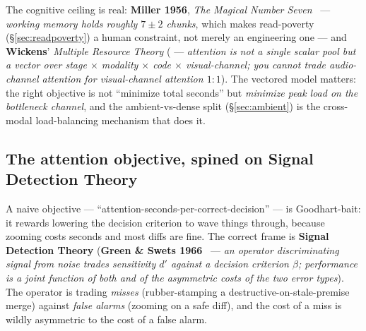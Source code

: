 \documentclass[11pt,a4paper]{article}
\theoremstyle{definition}
\theoremstyle{plain}
\begin{document}

The cognitive ceiling is real: \textbf{Miller 1956}, \emph{The Magical Number
Seven}~ --- \emph{working memory holds roughly $7\pm2$ chunks},
which makes read-poverty (\S\ref{sec:readpoverty}) a human constraint, not merely an
engineering one --- and \textbf{Wickens}' \emph{Multiple Resource Theory}
( --- \emph{attention is not a single scalar pool but a vector
over stage $\times$ modality $\times$ code $\times$ visual-channel; you cannot trade
audio-channel attention for visual-channel attention $1{:}1$}). The vectored model
matters: the right objective is not ``minimize total seconds'' but \emph{minimize
peak load on the bottleneck channel}, and the ambient-vs-dense split
(\S\ref{sec:ambient}) is the cross-modal load-balancing mechanism that does it.

\subsection{The attention objective, spined on Signal Detection Theory}\label{sec:sdt}

A naive objective --- ``attention-seconds-per-correct-decision'' --- is
Goodhart-bait: it rewards lowering the decision criterion to wave things through,
because zooming costs seconds and most diffs are fine. The correct frame is
\textbf{Signal Detection Theory} (\textbf{Green \& Swets 1966}~
--- \emph{an operator discriminating signal from noise trades sensitivity $d'$
against a decision criterion $\beta$; performance is a joint function of both and of
the asymmetric costs of the two error types}). The operator is trading \emph{misses}
(rubber-stamping a destructive-on-stale-premise merge) against \emph{false alarms}
(zooming on a safe diff), and the cost of a miss is wildly asymmetric to the cost of
a false alarm.
\end{document}
